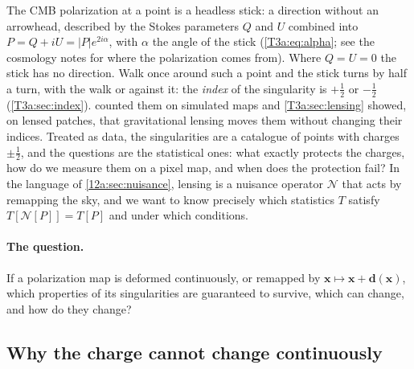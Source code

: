 The CMB polarization at a point is a headless stick: a direction without an arrowhead, described by the Stokes
parameters $Q$ and $U$ combined into $P=Q+iU=|P|e^{2i\alpha}$, with $\alpha$ the angle of the stick
(\cref{T3a:eq:alpha}; see the cosmology notes for where the polarization comes from). Where $Q=U=0$ the stick has no
direction. Walk once around such a point and the stick turns by half a turn, with the walk or against it: the
\emph{index} of the singularity is $+\frac12$ or $-\frac12$ (\cref{T3a:sec:index}).  counted them
on simulated maps and \cref{T3a:sec:lensing} showed, on lensed patches, that gravitational lensing moves them without
changing their indices. Treated as data, the singularities are a catalogue of points with charges $\pm\frac12$, and
the questions are the statistical ones: what exactly protects the
charges, how do we measure them on a pixel map, and when does the protection fail? In the language of
\cref{12a:sec:nuisance}, lensing is a nuisance operator $\mathcal N$ that acts by remapping the sky, and we want to know
precisely which statistics $T$ satisfy $T[\mathcal N[P]]=T[P]$ and under which conditions.

\paragraph{The question.} If a polarization map is deformed continuously, or remapped by $\bm x\mapsto\bm x+\bm d(\bm x)$,
which properties of its singularities are guaranteed to survive, which can change, and how do they change?

\subsection{Why the charge cannot change continuously}
\label{12b:sec:charge-integer}


